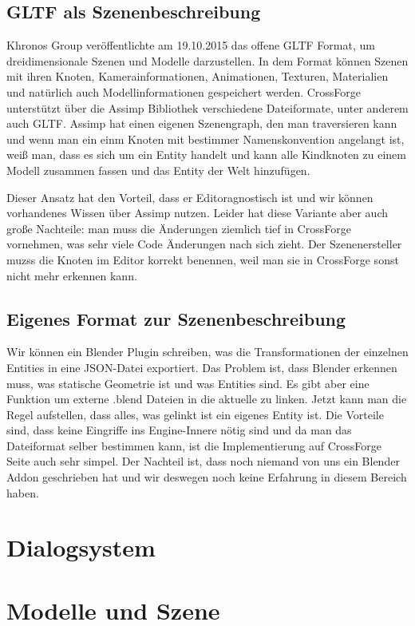 \subsection{GLTF als Szenenbeschreibung}

Khronos Group veröffentlichte am 19.10.2015 das offene GLTF Format, um dreidimensionale Szenen und Modelle darzustellen. In dem Format können Szenen mit ihren Knoten, Kamerainformationen, Animationen, Texturen, Materialien und natürlich auch Modellinformationen gespeichert werden. CrossForge unterstützt über die Assimp Bibliothek verschiedene Dateiformate, unter anderem auch GLTF. Assimp hat einen eigenen Szenengraph, den man traversieren kann und wenn man ein einm Knoten mit bestimmer Namenskonvention angelangt ist, weiß man, dass es sich um ein Entity handelt und kann alle Kindknoten zu einem Modell zusammen fassen und das Entity der Welt hinzufügen. 

Dieser Ansatz hat den Vorteil, dass er Editoragnostisch ist und wir können vorhandenes Wissen über Assimp nutzen. Leider hat diese Variante aber auch große Nachteile: man muss die Änderungen ziemlich tief in CrossForge vornehmen, was sehr viele Code Änderungen nach sich zieht. Der Szenenersteller muzss die Knoten im Editor korrekt benennen, weil man sie in CrossForge sonst nicht mehr erkennen kann.

\subsection{Eigenes Format zur Szenenbeschreibung}

Wir können ein Blender Plugin schreiben, was die Transformationen der einzelnen Entities in eine JSON-Datei exportiert. Das Problem ist, dass Blender erkennen muss, was statische Geometrie ist und was Entities sind. Es gibt aber eine Funktion um externe .blend Dateien in die aktuelle zu linken. Jetzt kann man die Regel aufstellen, dass alles, was gelinkt ist ein eigenes Entity ist. Die Vorteile sind, dass keine Eingriffe ins Engine-Innere nötig sind und da man das Dateiformat selber bestimmen kann, ist die Implementierung auf CrossForge Seite auch sehr simpel. Der Nachteil ist, dass noch niemand von uns ein Blender Addon geschrieben hat und wir deswegen noch keine Erfahrung in diesem Bereich haben.

\section{Dialogsystem}

\section{Modelle und Szene}